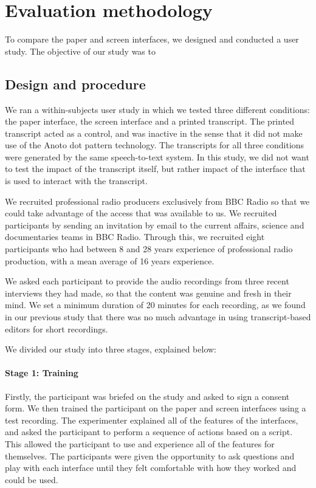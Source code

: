 \section{Evaluation methodology}\label{sec:method}

To compare the paper and screen interfaces, we designed and conducted a user study.
The objective of our study was to 

\subsection{Design and procedure}
We ran a within-subjects user study in which we tested three different conditions: the paper interface, the screen
interface and a printed transcript. The printed transcript acted as a control, and was inactive in the sense that it
did not make use of the Anoto dot pattern technology.  The transcripts for all three conditions were generated by the
same speech-to-text system. In this study, we did not want to test the impact of the transcript itself, but rather
impact of the interface that is used to interact with the transcript.

We recruited professional radio producers exclusively from BBC Radio so that we could take advantage of the access that
was available to us. We recruited participants by sending an invitation by email to the current affairs, science and
documentaries teams in BBC Radio.  Through this, we recruited eight participants who had between 8 and 28 years
experience of professional radio production, with a mean average of 16 years experience.

We asked each participant to provide the audio recordings from three recent interviews they had made, so that the
content was genuine and fresh in their mind. We set a minimum duration of 20 minutes for each recording, as we found in
our previous study that there was no much advantage in using transcript-based editors for short recordings.

We divided our study into three stages, explained below:

\paragraph{Stage 1: Training}

Firstly, the participant was briefed on the study and asked to sign a consent form.  We then trained the
participant on the paper and screen interfaces using a test recording.  The experimenter explained all of the features
of the interfaces, and asked the participant to perform a sequence of actions based on a script. This allowed the
participant to use and experience all of the features for themselves. The participants were given the opportunity to
ask questions and play with each interface until they felt comfortable with how they worked and could be used.

